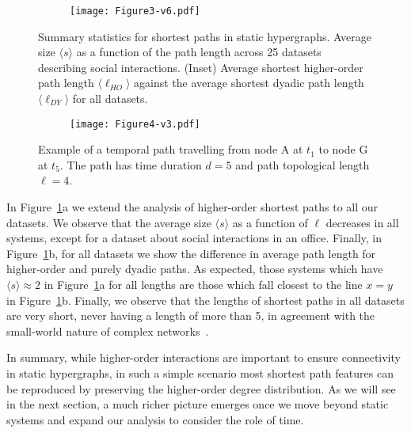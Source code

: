 \documentclass[a4paper,pre,reqno,superscriptaddress, twocolumn, floatfix]{revtex4}
\def\numdatasets{25 }
\def\ho{higher-order }
\begin{document}
\begin{figure}[ht!]
    \begin{subfigure}{\linewidth}
        \texttt{[image: Figure3-v6.pdf]}
    \end{subfigure}%
    \caption{ \justifying   
    Summary statistics for shortest paths in static hypergraphs.
    Average size $\langle{s}\rangle$ as a function of the path length across \numdatasets datasets describing social interactions. 
    (Inset) Average shortest \ho path length $\langle \ell_{HO}\rangle$ against the average shortest dyadic path length $\langle \ell_{DY}\rangle$ for all datasets. 
    }
    \label{fig:3}
\end{figure}


\begin{figure*}[ht!]
    \begin{subfigure}{\textwidth}
    \texttt{[image: Figure4-v3.pdf]}
    \end{subfigure}%
    \caption{ \justifying
        Example of a temporal path travelling from node A at $t_1$ to node G at $t_5$. The path has time duration $d=5$ and path topological length $\ell=4$.
    }
    \label{fig:4}
\end{figure*}


In Figure~\ref{fig:3}a we extend the analysis of \ho shortest paths to all our datasets. We observe that the average size $\langle{s}\rangle$ as a function of $\ell$ decreases in all systems, except for a dataset about social interactions in an office. Finally, in Figure~\ref{fig:3}b, for all datasets we show the difference in average path length for \ho and purely dyadic paths. 
As expected, those systems which have $\langle{s}\rangle \approx 2$ in Figure~\ref{fig:3}a for all lengths are those which fall closest to the line $x=y$ in Figure~\ref{fig:3}b. Finally, we observe that the lengths of shortest paths in all datasets are very short, never having a length of more than 5, in agreement with the small-world nature of complex networks~\cite{wattsstrogatz1998smallworld}. 




In summary, while \ho interactions are important to ensure connectivity in static hypergraphs, in such a simple scenario most shortest path features can be reproduced by preserving the \ho degree distribution. As we will see in the next section, a much richer picture emerges once we move beyond static systems and expand our analysis to consider the role of time. 
\end{document}
